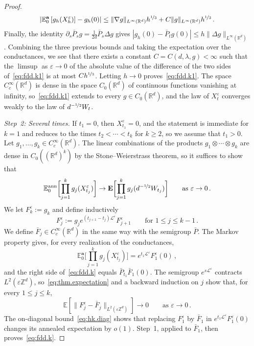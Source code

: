 \documentclass[11pt]{amsart}
\numberwithin{equation}{section}
\newcommand{\Z}{\mathbb{Z}}
\newcommand{\R}{\mathbb{R}}
\newcommand{\E}{\mathbb{E}}
\newcommand{\ba}{\mathbf{a}}
\newcommand{\eps}{\varepsilon}
\newcommand{\Leps}{\mathcal{L}^\varepsilon}
\newcommand{\nf}{\nicefrac}
\begin{document}
\begin{proof}
\begin{equation*}
    \left| \E^\ba_0 \left[ g_h(X^\eps_h) \right] - g_h(0) \right| \leq \|\nabla g\|_{L^\infty(\R^d)} h^{\nf13} + C \|g\|_{L^\infty(\R^d)} h^{\nf13}\,.
\end{equation*}
Finally, the identity $\partial_s \bar P_s g = \frac{1}{2d} \bar P_s \Delta g$ gives $|g_h(0) - \bar P_t g(0)| \leq h \|\Delta g\|_{L^\infty(\R^d)}$.
Combining the three previous bounds and taking the expectation over the conductances, we see that there exists a constant $C = C(d, \lambda, g) < \infty$ such that the $\limsup$ as $\eps \to 0$ of the absolute value of the difference of the two sides of~\eqref{eq:fdd.k1} is at most $C h^{\nf13}$.
Letting $h \to 0$ proves~\eqref{eq:fdd.k1}.
The space $C^\infty_c(\R^d)$ is dense in the space $C_0(\R^d)$ of continuous functions vanishing at infinity, so~\eqref{eq:fdd.k1} extends to every $g \in C_0(\R^d)$, and the law of $X^\eps_t$ converges weakly to the law of $d^{-\nf12} W_t$.

\smallskip

\emph{Step~2: Several times.}
If $t_1 = 0$, then $X^\eps_{t_1} = 0$, and the statement is immediate for $k = 1$ and reduces to the times $t_2 < \cdots < t_k$ for $k \geq 2$, so we assume that $t_1 > 0$.
Let $g_1, \ldots, g_k \in C^\infty_c(\R^d)$.
The linear combinations of the products $g_1 \otimes \cdots \otimes g_k$ are dense in $C_0((\R^d)^k)$ by the Stone--Weierstrass theorem, so it suffices to show that
\begin{equation} \label{eq:fdd.k}
    \E^{\mathrm{ann}}_0 \biggl[ \prod_{j=1}^k g_j(X^\eps_{t_j}) \biggr] \to \mathbf{E} \biggl[ \prod_{j=1}^k g_j(d^{-\nf12} W_{t_j}) \biggr] \qquad \text{as } \eps \to 0\,.
\end{equation}
We let $F^\eps_k := g_k$ and define inductively
\begin{equation*}
    F^\eps_j := g_j e^{(t_{j+1} - t_j) \Leps} F^\eps_{j+1} \qquad \text{for } 1 \leq j \leq k-1\,.
\end{equation*}
We define $\bar F_j \in C^\infty_c(\R^d)$ in the same way with the semigroup $\bar P$.
The Markov property gives, for every realization of the conductances,
\begin{equation*}
    \E^\ba_0 \biggl[ \prod_{j=1}^k g_j(X^\eps_{t_j}) \biggr] = e^{t_1 \Leps} F^\eps_1(0)\,,
\end{equation*}
and the right side of~\eqref{eq:fdd.k} equals $\bar P_{t_1} \bar F_1(0)$.
The semigroup $e^{s \Leps}$ contracts $L^2(\eps \Z^d)$, so~\eqref{eq:thm.expectation} and a backward induction on $j$ show that, for every $1 \leq j \leq k$,
\begin{equation*}
    \E \left[ \|F^\eps_j - \bar F_j\|_{L^2(\eps \Z^d)} \right] \to 0 \qquad \text{as } \eps \to 0\,.
\end{equation*}
The on-diagonal bound~\eqref{eq:hk.diag} shows that replacing $F^\eps_1$ by $\bar F_1$ in $e^{t_1\Leps}F^\eps_1(0)$ changes its annealed expectation by $o(1)$.
Step~1, applied to $\bar F_1$, then proves~\eqref{eq:fdd.k}.
\end{proof}
\end{document}

